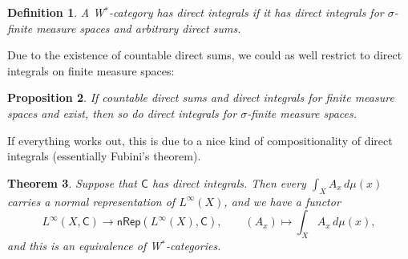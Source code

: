 \documentclass[reqno,T1]{amsproc}
\newcommand{\cat}[1]{\mathsf{#1}}		%
\newcommand{\NRep}[1]{\mathsf{nRep}(#1)}	%
\theoremstyle{plain}
\newtheorem{thm}{Theorem}[section]
\newtheorem{prop}[thm]{Proposition}
\newtheorem{defn}[thm]{Definition}
\theoremstyle{remark}
\numberwithin{equation}{section}
\begin{document}

\begin{defn}
A W$^*$-category \emph{has direct integrals} if it has direct integrals for $\sigma$-finite measure spaces and arbitrary direct sums.
\end{defn}


Due to the existence of countable direct sums, we could as well restrict to direct integrals on finite measure spaces:

\begin{prop}
If countable direct sums and direct integrals for finite measure spaces and exist, then so do direct integrals for $\sigma$-finite measure spaces.
\end{prop}

If everything works out, this is due to a nice kind of compositionality of direct integrals (essentially Fubini's theorem).


\begin{thm}
Suppose that $\cat{C}$ has direct integrals. Then every $\int_X A_x \, d\mu(x)$ carries a normal representation of $L^\infty(X)$, and we have a functor
\[
	L^\infty(X,\cat{C}) \to \NRep{L^\infty(X),\cat{C}} , \qquad (A_x) \mapsto \int_X A_x \, d\mu(x),
\]
and this is an equivalence of W$^*$-categories.
\end{thm}




\end{document}
